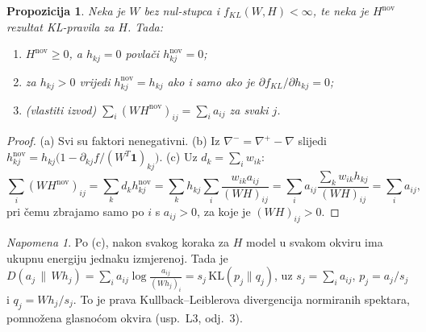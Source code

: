 \documentclass[11pt,a4paper]{article}
\theoremstyle{definition}
\theoremstyle{plain}
\newtheorem{propozicija}[definicija]{Propozicija}
\theoremstyle{remark}
\newtheorem{napomena}[definicija]{Napomena}
\newcommand{\one}{\mathbf{1}}
\newcommand{\Dkl}[2]{D(#1\,\|\,#2)}
\begin{document}
\begin{propozicija}\label{prop:mu-svojstva}
Neka je $W$ bez nul-stupca i $f_{KL}(W,H)<\infty$, te neka je $H^{\mathrm{nov}}$ rezultat
KL-pravila za $H$. Tada:
\begin{enumerate}[label=(\alph*)]
\item $H^{\mathrm{nov}}\geq0$, a $h_{kj}=0$ povlači $h^{\mathrm{nov}}_{kj}=0$;
\item za $h_{kj}>0$ vrijedi $h^{\mathrm{nov}}_{kj}=h_{kj}$ ako i samo ako je $\partial f_{KL}/\partial h_{kj}=0$;
\item (vlastiti izvod) $\sum_i(WH^{\mathrm{nov}})_{ij}=\sum_ia_{ij}$ za svaki $j$.
\end{enumerate}
\end{propozicija}
\begin{proof}
(a) Svi su faktori nenegativni. (b) Iz $\nabla^-=\nabla^+-\nabla$ slijedi
$h^{\mathrm{nov}}_{kj}=h_{kj}\bigl(1-\partial_{kj}f/(W^T\one)_{kj}\bigr)$. (c) Uz
$d_k=\sum_iw_{ik}$:
\[
  \sum_i(WH^{\mathrm{nov}})_{ij}=\sum_kd_kh^{\mathrm{nov}}_{kj}
  =\sum_kh_{kj}\sum_i\frac{w_{ik}a_{ij}}{(WH)_{ij}}
  =\sum_ia_{ij}\frac{\sum_kw_{ik}h_{kj}}{(WH)_{ij}}=\sum_ia_{ij},
\]
pri čemu zbrajamo samo po $i$ s $a_{ij}>0$, za koje je $(WH)_{ij}>0$.
\end{proof}

\begin{napomena}
Po (c), nakon svakog koraka za $H$ model u svakom okviru ima ukupnu energiju jednaku izmjerenoj.
Tada je $\Dkl{a_j}{Wh_j}=\sum_ia_{ij}\log\frac{a_{ij}}{(Wh_j)_i}=s_j\,\mathrm{KL}(p_j\|q_j)$, uz
$s_j=\sum_ia_{ij}$, $p_j=a_j/s_j$ i $q_j=Wh_j/s_j$. To je prava Kullback–Leiblerova divergencija
normiranih spektara, pomnožena glasnoćom okvira (usp.\ L3, odj.~3).
\end{napomena}
\end{document}
